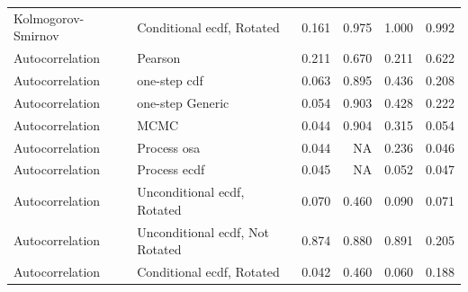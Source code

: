 \documentclass[
]{article}
\begin{document}
\begin{table}[H]
\begin{tabular}[t]{llrrrr}
Kolmogorov- Smirnov & Conditional ecdf, Rotated & 0.161 & 0.975 & 1.000 & 0.992\\
Autocorrelation & Pearson & 0.211 & 0.670 & 0.211 & 0.622\\
Autocorrelation & one-step cdf & 0.063 & 0.895 & 0.436 & 0.208\\
\addlinespace
Autocorrelation & one-step Generic & 0.054 & 0.903 & 0.428 & 0.222\\
Autocorrelation & MCMC & 0.044 & 0.904 & 0.315 & 0.054\\
Autocorrelation & Process osa & 0.044 & NA & 0.236 & 0.046\\
Autocorrelation & Process ecdf & 0.045 & NA & 0.052 & 0.047\\
Autocorrelation & Unconditional ecdf, Rotated & 0.070 & 0.460 & 0.090 & 0.071\\
\addlinespace
Autocorrelation & Unconditional ecdf, Not Rotated & 0.874 & 0.880 & 0.891 & 0.205\\
Autocorrelation & Conditional ecdf, Rotated & 0.042 & 0.460 & 0.060 & 0.188\\
\bottomrule
\end{tabular}
\end{table}
\end{document}
